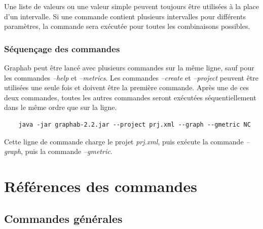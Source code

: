 \documentclass[a4paper,10pt]{report}
\begin{document}
Une liste de valeurs ou une valeur simple peuvent toujours être utilisées à la place d'un intervalle.
Si une commande contient plusieurs intervalles pour différents paramètres, la commande sera exécutée pour toutes les combinaisons possibles.

\subsection{Séquençage des commandes}
Graphab peut être lancé avec plusieurs commandes sur la même ligne, sauf pour les commandes \textit{--help} et \textit{--metrics}.
Les commandes \textit{--create} et \textit{--project} peuvent être utilisées une seule fois et doivent être la première commande.
Après une de ces deux commandes, toutes les autres commandes seront exécutées séquentiellement dans le même ordre que sur la ligne.

\begin{Verbatim}
	java -jar graphab-2.2.jar --project prj.xml --graph --gmetric NC  
\end{Verbatim}
Cette ligne de commande charge le projet \textit{prj.xml}, puis exécute la commande \textit{--graph}, puis la commande \textit{--gmetric}.


\chapter{Références des commandes}
\section{Commandes générales}
\end{document}
